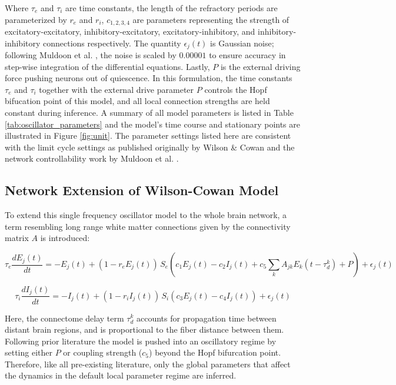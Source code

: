 Where $\tau_e$ and $\tau_i$ are time constants, the length of the refractory periods are parameterized by $r_e$ and $r_i$, $c_{1,2,3,4}$ are parameters representing the strength of excitatory-excitatory, inhibitory-excitatory, excitatory-inhibitory, and inhibitory-inhibitory connections respectively. The quantity $\epsilon_{j} (t)$ is Gaussian noise; following Muldoon et al. \cite{muldoon_stimulation-based_2016}, the noise is scaled by $0.00001$ to ensure accuracy in step-wise integration of the differential equations. Lastly, $P$ is the external driving force pushing neurons out of quiescence. In this formulation, the time constants $\tau_e$ and $\tau_i$ together with the external drive parameter $P$ controls the Hopf bifucation point of this model, and all local connection strengths are held constant during inference. A summary of all model parameters is listed in Table \ref{tab:oscillator_parameters} and the model's time course and stationary points are illustrated in Figure \ref{fig:unit}. The parameter settings listed here are consistent with the limit cycle settings as published originally by Wilson \& Cowan \cite{Wilson1972} and the network controllability work by Muldoon et al.  \cite{muldoon_stimulation-based_2016}.

\subsection{Network Extension of Wilson-Cowan Model}
To extend this single frequency oscillator model to the whole brain network, a term resembling long range white matter connections given by the connectivity matrix $A$ is introduced:

\begin{equation}
    \label{eq:wcn_ex}
\tau_e \frac{dE_{j}(t)}{dt} = -E_{j}(t) + (1 - r_e E_{j}(t)) \, S_e(c_1 E_{j}(t) - c_2 I_{j}(t) + c_5 \sum_{k} A_{jk} E_{k}(t - \tau_d^k) + P) + \epsilon_{j} (t)
\end{equation}

\begin{equation}
\label{eq:wcn_in}
\tau_i \frac{dI_{j}(t)}{dt} = -I_{j}(t) + (1 - r_i I_{j}(t)) \, S_i(c_3 E_{j}(t) - c_4 I_{j}(t)) + \epsilon_{j} (t)
\end{equation}

Here, the connectome delay term $\tau_d^k$ accounts for propagation time between distant brain regions, and is proportional to the fiber distance between them. Following prior literature \cite{muldoon_stimulation-based_2016} the model is pushed into an oscillatory regime by setting either $P$ or coupling strength ($c_5$) beyond the Hopf bifurcation point. Therefore,  like all pre-existing literature, only the global parameters that affect the dynamics in the default local parameter regime are inferred. 

